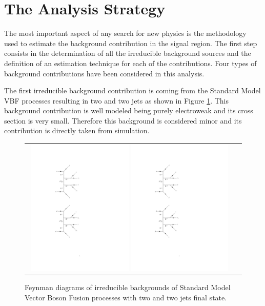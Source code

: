 \section{The Analysis Strategy}

The most important aspect of any search for new physics is the methodology used to estimate the background contribution in the signal region. The first step consists in the determination of all the irreducible background sources and the definition of an estimation technique for each of the contributions. Four types of background contributions have been considered in this analysis. 

The first irreducible background contribution is coming from the Standard Model VBF processes resulting in two \hadtau and two jets as shown in Figure \ref{fig:background_SMVBF}. This background contribution is well modeled being purely electroweak and its cross section is very small. Therefore this background is considered minor and its contribution is directly taken from simulation.

\begin{figure}[tbh!]
	\centering
	\begin{tabular}{cc}
		\includegraphics[width=0.48\textwidth]{diagrams/pics/background_SMVBFminus.pdf}
		\includegraphics[width=0.48\textwidth]{diagrams/pics/background_SMVBFplus.pdf} 		
	\end{tabular}
	\caption{Feynman diagrams of irreducible backgrounds of Standard Model Vector Boson Fusion processes with two \hadtau and two jets final state. }
	\label{fig:background_SMVBF}
\end{figure}

